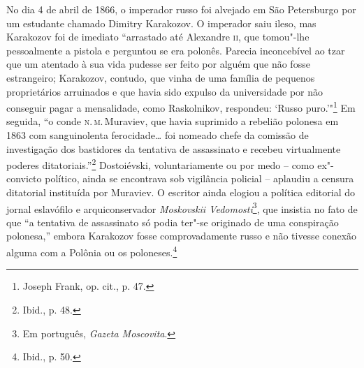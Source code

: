 No dia 4 de abril de 1866, o imperador russo foi alvejado em São
Petersburgo por um estudante chamado Dimitry Karakozov. O imperador saiu
ileso, mas Karakozov foi de imediato ``arrastado até Alexandre \textsc{ii}, que
tomou"-lhe pessoalmente a pistola e perguntou se era polonês. Parecia
inconcebível ao tzar que um atentado à sua vida pudesse ser feito por
alguém que não fosse estrangeiro; Karakozov, contudo, que vinha de uma
família de pequenos proprietários arruinados e que havia sido expulso da
universidade por não conseguir pagar a mensalidade, como Raskolnikov,
respondeu: `Russo puro.'"\footnote{Joseph Frank, op. cit., p. 47.} Em
seguida, ``o conde \textsc{n.\,m.}\,Muraviev, que havia suprimido a rebelião
polonesa em 1863 com sanguinolenta ferocidade\ldots{} foi nomeado chefe
da comissão de investigação dos bastidores da tentativa de assassinato e
recebeu virtualmente poderes ditatoriais.''\footnote{Ibid., p. 48.}
Dostoiévski, voluntariamente ou por medo -- como ex"-convicto político,
ainda se encontrava sob vigilância policial -- aplaudiu a censura
ditatorial instituída por Muraviev. O escritor ainda elogiou a política
editorial do jornal eslavófilo e arquiconservador \textit{Moskovskii
Vedomosti}\footnote{Em português, \textit{Gazeta Moscovita}.}, que insistia no fato de que ``a
tentativa de assassinato só podia ter"-se originado de uma conspiração
polonesa,'' embora Karakozov fosse comprovadamente russo e não tivesse
conexão alguma com a Polônia ou os poloneses.\footnote{Ibid., p. 50.}

